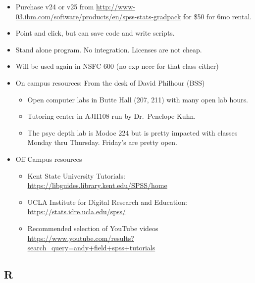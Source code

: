 \documentclass[]{article}
\providecommand{\tightlist}{%
  \setlength{\itemsep}{0pt}\setlength{\parskip}{0pt}}
\begin{document}
\begin{itemize}
\tightlist
\item
  Purchase v24 or v25 from
  \url{http://www-03.ibm.com/software/products/en/spss-stats-gradpack}
  for \$50 for 6mo rental.
\item
  Point and click, but can save code and write scripts.
\item
  Stand alone program. No integration. Licenses are not cheap.
\item
  Will be used again in NSFC 600 (no exp necc for that class either)
\item
  On campus resources: From the desk of David Philhour (BSS)

  \begin{itemize}
  \tightlist
  \item
    Open computer labs in Butte Hall (207, 211) with many open lab
    hours.
  \item
    Tutoring center in AJH108 run by Dr.~Penelope Kuhn.
  \item
    The psyc depth lab is Modoc 224 but is pretty impacted with classes
    Monday thru Thursday. Friday's are pretty open.
  \end{itemize}
\item
  Off Campus resources

  \begin{itemize}
  \tightlist
  \item
    Kent State University Tutorials:
    \url{https://libguides.library.kent.edu/SPSS/home}
  \item
    UCLA Institute for Digital Research and Education:
    \url{https://stats.idre.ucla.edu/spss/}
  \item
    Recommended selection of YouTube videos
    \url{https://www.youtube.com/results?search_query=andy+field+spss+tutorials}
  \end{itemize}
\end{itemize}

\subsection{R}\label{r}
\end{document}
